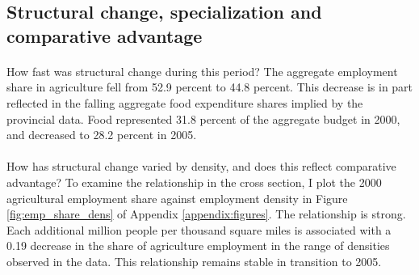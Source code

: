 \documentclass[]{article}
\theoremstyle{plain}
\begin{document}
 
\subsection*{Structural change, specialization and comparative advantage}
\paragraph*{}
How fast was structural change during this period? The aggregate employment share in agriculture fell from 52.9 percent to 44.8 percent. This decrease is in part reflected in the falling aggregate food expenditure shares implied by the provincial data. Food represented 31.8 percent of the aggregate budget in 2000, and decreased to 28.2 percent in 2005. 
\paragraph*{}
How has structural change varied by density, and does this reflect comparative advantage? To examine the relationship in the cross section, I plot the 2000 agricultural employment share against employment density in Figure \ref{fig:emp_share_dens} of Appendix \ref{appendix:figures}. The relationship is strong. Each additional million people per thousand square miles is associated with a 0.19 decrease in the share of agriculture employment in the range of densities observed in the data. This relationship remains stable in transition to 2005.   
\end{document}
